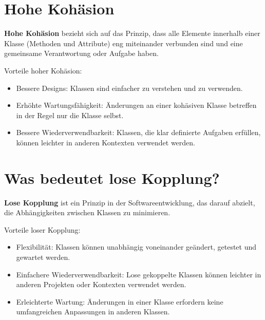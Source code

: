 \documentclass[main.tex]{subfiles}
\begin{document}
\section*{Hohe Kohäsion}

\textbf{Hohe Kohäsion} bezieht sich auf das Prinzip, dass alle Elemente innerhalb einer Klasse (Methoden und Attribute) eng miteinander verbunden sind und eine gemeinsame Verantwortung oder Aufgabe haben. 

Vorteile hoher Kohäsion:
\begin{itemize}
    \item Bessere Designs: Klassen sind einfacher zu verstehen und zu verwenden.
    \item Erhöhte Wartungsfähigkeit: Änderungen an einer kohäsiven Klasse betreffen in der Regel nur die Klasse selbst.
    \item Bessere Wiederverwendbarkeit: Klassen, die klar definierte Aufgaben erfüllen, können leichter in anderen Kontexten verwendet werden.
\end{itemize}

\section*{Was bedeutet lose Kopplung?}

\textbf{Lose Kopplung} ist ein Prinzip in der Softwareentwicklung, das darauf abzielt, die Abhängigkeiten zwischen Klassen zu minimieren. 

Vorteile loser Kopplung:
\begin{itemize}
    \item Flexibilität: Klassen können unabhängig voneinander geändert, getestet und gewartet werden.
    \item Einfachere Wiederverwendbarkeit: Lose gekoppelte Klassen können leichter in anderen Projekten oder Kontexten verwendet werden.
    \item Erleichterte Wartung: Änderungen in einer Klasse erfordern keine umfangreichen Anpassungen in anderen Klassen.
\end{itemize}
\end{document}
